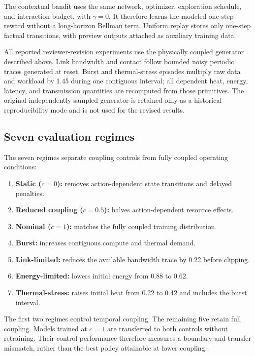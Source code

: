 \documentclass[11pt]{article}
\begin{document}
The contextual bandit uses the same network, optimizer, exploration schedule, and interaction budget, with $\gamma=0$. It therefore learns the modeled one-step reward without a long-horizon Bellman term. Uniform replay stores only one-step factual transitions, with preview outputs attached as auxiliary training data.

All reported reviewer-revision experiments use the physically coupled generator described above. Link bandwidth and contact follow bounded noisy periodic traces generated at reset. Burst and thermal-stress episodes multiply raw data and workload by 1.45 during one contiguous interval; all dependent heat, energy, latency, and transmission quantities are recomputed from those primitives. The original independently sampled generator is retained only as a historical reproducibility mode and is not used for the revised results.

\subsection{Seven evaluation regimes}

The seven regimes separate coupling controls from fully coupled operating conditions:

\begin{enumerate}[leftmargin=1.6em]
    \item \textbf{Static ($c=0$):} removes action-dependent state transitions and delayed penalties.
    \item \textbf{Reduced coupling ($c=0.5$):} halves action-dependent resource effects.
    \item \textbf{Nominal ($c=1$):} matches the fully coupled training distribution.
    \item \textbf{Burst:} increases contiguous compute and thermal demand.
    \item \textbf{Link-limited:} reduces the available bandwidth trace by 0.22 before clipping.
    \item \textbf{Energy-limited:} lowers initial energy from 0.88 to 0.62.
    \item \textbf{Thermal-stress:} raises initial heat from 0.22 to 0.42 and includes the burst interval.
\end{enumerate}

The first two regimes control temporal coupling. The remaining five retain full coupling. Models trained at $c=1$ are transferred to both controls without retraining. Their control performance therefore measures a boundary and transfer mismatch, rather than the best policy attainable at lower coupling.
\end{document}
